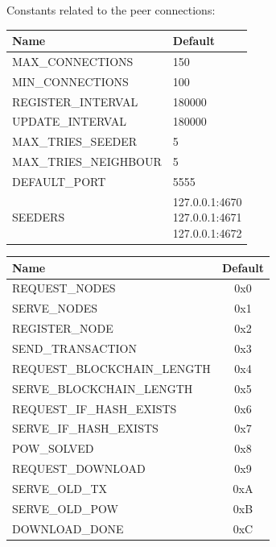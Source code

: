 \documentclass[../documentation.tex]{subfiles}
\begin{document}
Constants related to the peer connections:

\bgroup{}
\def\arraystretch{1.25}
\begin{tabular}{|l|l|}
    \hline
    \textbf{Name} & \textbf{Default}
    \\ \hline
    MAX\_CONNECTIONS & 150
    \\ \hline
    MIN\_CONNECTIONS & 100
    \\ \hline
    REGISTER\_INTERVAL & 180000
    \\ \hline
    UPDATE\_INTERVAL & 180000
    \\ \hline
    MAX\_TRIES\_SEEDER & 5
    \\ \hline
    MAX\_TRIES\_NEIGHBOUR & 5
    \\ \hline
    DEFAULT\_PORT & 5555
    \\ \hline
    SEEDERS & \makecell[t] {
        127.0.0.1:4670 \\
        127.0.0.1:4671 \\
        127.0.0.1:4672
    }
    \\ \hline
\end{tabular}
\egroup{}

\pagebreak


\bgroup{}
\def\arraystretch{1.25}
\begin{tabular}{|l|c|}
    \hline
    \textbf{Name} & \textbf{Default}
    \\ \hline
    REQUEST\_NODES & 0x0
    \\ \hline
    SERVE\_NODES & 0x1
    \\ \hline
    REGISTER\_NODE & 0x2
    \\ \hline
    SEND\_TRANSACTION & 0x3
    \\ \hline
    REQUEST\_BLOCKCHAIN\_LENGTH & 0x4
    \\ \hline
    SERVE\_BLOCKCHAIN\_LENGTH & 0x5
    \\ \hline
    REQUEST\_IF\_HASH\_EXISTS & 0x6
    \\ \hline
    SERVE\_IF\_HASH\_EXISTS & 0x7
    \\ \hline
    POW\_SOLVED & 0x8
    \\ \hline
    REQUEST\_DOWNLOAD & 0x9
    \\ \hline
    SERVE\_OLD\_TX & 0xA
    \\ \hline
    SERVE\_OLD\_POW & 0xB
    \\ \hline
    DOWNLOAD\_DONE & 0xC
    \\ \hline

\end{tabular}
\egroup{}
\end{document}
